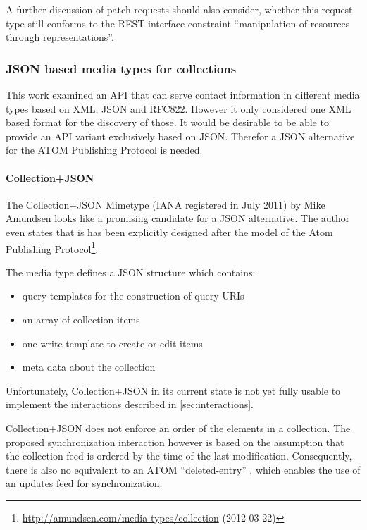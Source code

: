 \documentclass[11pt,a4paper,headsepline,twoside]{scrartcl}		%
\newcommand{\citeurl}[2]{\url{#1} (#2)}
\begin{document}
A further discussion of patch requests should also consider, whether this
request type still conforms to the REST interface constraint ``manipulation of
resources through representations''\cite[sec. 5.1.5]{Fielding2000}.

\subsubsection{JSON based media types for collections}
\label{sec:media-types-coll}

This work examined an API that can serve contact information in different
media types based on XML, JSON and RFC822. However it only considered one XML
based format for the discovery of those. It would be desirable to be able to
provide an API variant exclusively based on JSON. Therefor a JSON alternative
for the ATOM Publishing Protocol is needed.

\paragraph{Collection+JSON}
\label{sec:collection+json}

The Collection+JSON Mimetype (IANA registered in July 2011) by Mike
Amundsen \cite{Amundsen2011a}\cite[ch. 3]{amundsen2011building} looks like a
promising candidate for a JSON alternative. The author even states that is has
been explicitly designed after the model of the Atom Publishing
Protocol\footnote{\citeurl{http://amundsen.com/media-types/collection}{2012-03-22}}.

The media type defines a JSON structure which contains:

\begin{itemize}
\item query templates for the construction of query URIs
\item an array of collection items
\item one write template to create or edit items
\item meta data about the collection
\end{itemize}

Unfortunately, Collection+JSON in its current state is not yet fully usable to
implement the interactions described in \ref{sec:interactions}.

Collection+JSON does not enforce an order of the elements in a collection. The
proposed synchronization interaction however is based on the assumption that the
collection feed is ordered by the time of the last modification. Consequently,
there is also no equivalent to an ATOM
``deleted-entry'' \cite{draft-snell-atompub-tombstones-14}, which enables the use
of an updates feed for synchronization.
\end{document}
